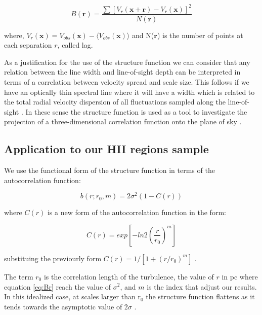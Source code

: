 \documentclass[fleqn,usenatbib, useAMS, a4paper]{mnras}
\begin{document}
\begin{equation}\label{eq:Br}
B(\boldsymbol{r})=\dfrac{\sum[V_{r}(\boldsymbol{x}+\boldsymbol{r})-V_{r}(\boldsymbol{x}) ]^{2}}{N(\boldsymbol{r})}
\end{equation}

where, $V_{r}(\boldsymbol{x})= V_{obs}(\boldsymbol{x})-\langle V_{obs}(\boldsymbol{x}) \rangle$ and N($\boldsymbol{r}$) is the number of points at each separation \(r\), called lag.

As a justification for the use of the structure function we can consider that any relation between the line width and line-of-sight depth can be interpreted in terms of a correlation between velocity spread and scale size.
This follows if we have an optically thin spectral line where it will have a width which is related to the total radial velocity dispersion of all fluctuations sampled along the line-of-sight \citep{1984ApJ...277..556S}. 
In these sense the structure function is used as a tool to investigate the projection of a three-dimensional correlation function onto the plane of sky \citep{arthur2016turbulence}.

\subsection{Application to our HII regions sample}\label{sec:apply}

We use the functional form of the structure function in terms of the autocorrelation function:

\begin{equation}\label{eq:ff}
b(r;r_0,m) = 2\sigma^2(1-C(r))
\end{equation}

where $C(r)$ is a new form of the autocorrelation function in the form:

\begin{equation}\label{eq:ffnew}
C(r) = exp[-ln2(\frac{r}{r_0})^m]
\end{equation}

substituing the previourly form $C(r)=1/[1+(r/r_{0})^{m}]$ \citep{1984ApJ...277..556S,arthur2016turbulence}.

The term $r_{0}$ is the correlation length of the turbulence, the value of \(r\) in pc where equation \ref{eq:Br} reach the value of \(\sigma^2\), and $m$ is the index that adjust our results.
In this idealized case, at scales larger than r$_{0}$ the structure function flattens as it tends towards the asymptotic value of 2$\sigma$ \citep{arthur2016turbulence}.
\end{document}
